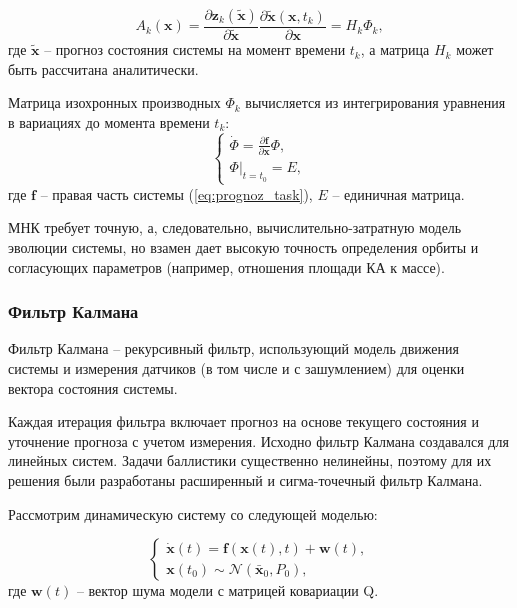 \begin{equation*}
    A_k(\mathbf{x}) = \frac{\partial \mathbf{z}_k (\mathbf{\tilde{x}})}{\partial \mathbf{\tilde{x}}}
    \frac{\partial \mathbf{\tilde{x}} (\mathbf{x}, t_k)}{\partial \mathbf{x}} = H_k \Phi_k,
\end{equation*}
где $\mathbf{\tilde{x}}$ -- прогноз состояния системы на момент времени $t_k$, 
а матрица $H_k$ может быть рассчитана аналитически.

Матрица изохронных производных $\Phi_k$ вычисляется 
из интегрирования уравнения в вариациях до момента времени $t_k$:
\begin{equation}
    \begin{cases}
        \dot{\Phi} = \frac{\partial \mathbf{f}}{\partial \mathbf{x}} \Phi, \\
        \Phi \big|_{t = t_0} = E,
        \label{eq:prognoz_phi}
    \end{cases}
\end{equation}
где $\mathbf{f}$ -- правая часть системы (\ref{eq:prognoz_task}), $E$ -- единичная матрица.

МНК требует точную, а, следовательно, вычислительно-затратную модель эволюции системы, но
взамен дает высокую точность определения орбиты и согласующих параметров (например,
отношения площади КА к массе).

\subsubsection{Фильтр Калмана}
Фильтр Калмана -- рекурсивный фильтр, использующий модель движения системы и
измерения датчиков (в том числе и с зашумлением) для оценки вектора состояния системы.

Каждая итерация фильтра включает прогноз на основе текущего состояния и уточнение прогноза
с учетом измерения. Исходно фильтр Калмана создавался для линейных систем. Задачи
баллистики существенно нелинейны, поэтому для их решения были разработаны 
расширенный и сигма-точечный фильтр Калмана. 

Рассмотрим динамическую систему со следующей моделью:

\begin{equation*}
    \begin{cases}
        \dot{\mathbf{x}}(t) = \mathbf{f}(\mathbf{x}(t), t) + \mathbf{w}(t), \\
        \mathbf{x}(t_0) \sim \mathcal{N}\left(\bar{\mathbf{x}}_0, P_0 \right),
    \end{cases}
\end{equation*}
где $\mathbf{w}(t)$ -- вектор шума модели с матрицей ковариации Q.

